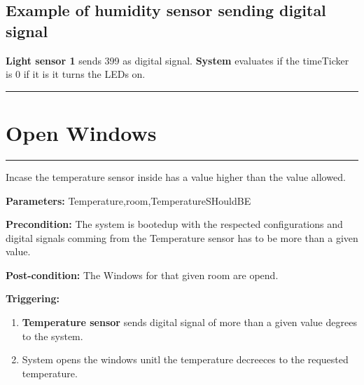 \subsection{Example of humidity sensor sending digital signal}
\textbf{Light sensor 1} sends 399 as digital signal. \textbf{System}
evaluates if the timeTicker is 0 if it is it turns the LEDs on.
\hfill
\vspace{0.5cm}
\hrule




\break




\section{Open Windows}

\hrule
\hfill
\vspace{0.5cm}
\label{operation:Open Windows}

Incase the temperature sensor inside has a value higher than the value allowed.
\begin{description}
\item \textbf{Parameters:} Temperature,room,TemperatureSHouldBE
\item \textbf{Precondition:} The system is bootedup with the respected
configurations and digital signals comming from the Temperature sensor has to be
more than a given value.
\item \textbf{Post-condition:} The Windows for that given room are opend.

\item \textbf{Triggering:}
\begin{enumerate}
\item \textbf{Temperature sensor} sends digital signal of more than a given
value degrees to the system.
\item System opens the windows unitl the temperature decreeces to the requested
temperature.
\end{enumerate}
\end{description}

